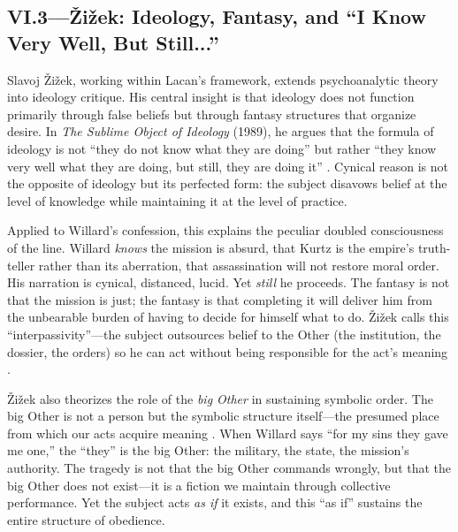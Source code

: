 \subsection*{VI.3—{\v{Z}}i{\v{z}}ek: Ideology, Fantasy, and ``I Know Very Well, But Still...''}
\label{ssec:vi-zizek}

Slavoj {\v{Z}}i{\v{z}}ek, working within Lacan's framework, extends psychoanalytic theory into 
ideology critique. His central insight is that ideology does not function primarily through 
false beliefs but through fantasy structures that organize desire. In \textit{The Sublime 
Object of Ideology} (1989), he argues that the formula of ideology is not ``they do not know 
what they are doing'' but rather ``they know very well what they are doing, but still, they 
are doing it'' \parencite[p.~32]{ZizekSublime1999}. Cynical reason is not the opposite of 
ideology but its perfected form: the subject disavows belief at the level of knowledge while 
maintaining it at the level of practice.

Applied to Willard's confession, this explains the peculiar doubled consciousness of the line. 
Willard \emph{knows} the mission is absurd, that Kurtz is the empire's truth-teller rather 
than its aberration, that assassination will not restore moral order. His narration is cynical, 
distanced, lucid. Yet \emph{still} he proceeds. The fantasy is not that the mission is just; 
the fantasy is that completing it will deliver him from the unbearable burden of having to 
decide for himself what to do. {\v{Z}}i{\v{z}}ek calls this ``interpassivity''---the subject 
outsources belief to the Other (the institution, the dossier, the orders) so he can act 
without being responsible for the act's meaning \parencite{ZizekSublime1999}.

{\v{Z}}i{\v{z}}ek also theorizes the role of the \emph{big Other} in sustaining symbolic 
order. The big Other is not a person but the symbolic structure itself---the presumed place 
from which our acts acquire meaning \parencite{ZizekSublime1999}. When Willard says ``for my 
sins they gave me one,'' the ``they'' is the big Other: the military, the state, the mission's 
authority. The tragedy is not that the big Other commands wrongly, but that the big Other does 
not exist---it is a fiction we maintain through collective performance. Yet the subject acts 
\emph{as if} it exists, and this ``as if'' sustains the entire structure of obedience.

